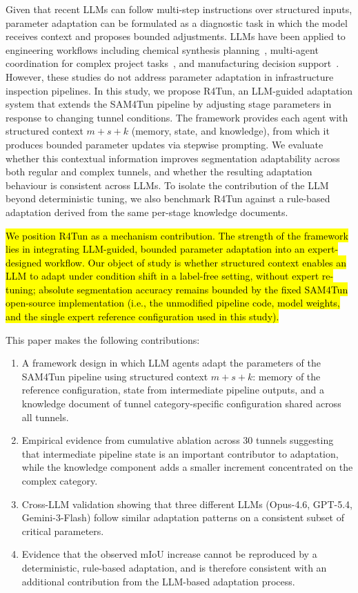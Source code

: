 \documentclass[a4paper,fleqn]{cas-dc}
\begin{document}
{Given that recent LLMs can follow multi-step instructions over structured inputs, parameter adaptation can be formulated as a diagnostic task in which the model receives context and proposes bounded adjustments. LLMs have been applied to engineering workflows including chemical synthesis planning~\citep{bran2024chemcrow}, multi-agent coordination for complex project tasks~\citep{qian2024chatdev, hong2024metagpt, chen2024comm}, and manufacturing decision support~\citep{garcia2024manufacturing}. However, these studies do not address parameter adaptation in infrastructure inspection pipelines. In this study, we propose R4Tun, an LLM-guided adaptation system that extends the SAM4Tun pipeline by adjusting stage parameters in response to changing tunnel conditions. The framework provides each agent with structured context $m+s+k$ (memory, state, and knowledge), from which it produces bounded parameter updates via stepwise prompting. We evaluate whether this contextual information improves segmentation adaptability across both regular and complex tunnels, and whether the resulting adaptation behaviour is consistent across LLMs. To isolate the contribution of the LLM beyond deterministic tuning, we also benchmark R4Tun against a rule-based adaptation derived from the same per-stage knowledge documents.

\hl{We position R4Tun as a mechanism contribution. The strength of the framework lies in integrating LLM-guided, bounded parameter adaptation into an expert-designed workflow. Our object of study is whether structured context enables an LLM to adapt under condition shift in a label-free setting, without expert re-tuning; absolute segmentation accuracy remains bounded by the fixed SAM4Tun open-source implementation (i.e., the unmodified pipeline code, model weights, and the single expert reference configuration used in this study).}

This paper makes the following contributions:
\begin{enumerate}
\item A framework design in which LLM agents adapt the parameters of the SAM4Tun pipeline using structured context $m+s+k$: memory of the reference configuration, state from intermediate pipeline outputs, and a knowledge document of tunnel category-specific configuration shared across all tunnels.
\item Empirical evidence from cumulative ablation across 30 tunnels suggesting that intermediate pipeline state is an important contributor to adaptation, while the knowledge component adds a smaller increment concentrated on the complex category.
\item Cross-LLM validation showing that three different LLMs (Opus-4.6, GPT-5.4, Gemini-3-Flash) follow similar adaptation patterns on a consistent subset of critical parameters.
\item Evidence that the observed mIoU increase cannot be reproduced by a deterministic, rule-based adaptation, and is therefore consistent with an additional contribution from the LLM-based adaptation process.
\end{enumerate}

}
\end{document}
